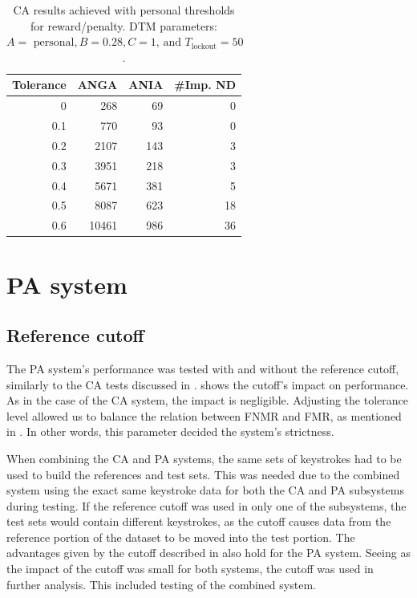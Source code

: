 \begin{table}[h]
\centering
\begin{tabular}{rrrr}
\hline
Tolerance & ANGA  & ANIA & \#Imp. ND  \\ \hline
0   & 268   & 69  & 0  \\
0.1 & 770   & 93  & 0  \\
0.2 & 2107  & 143 & 3  \\
0.3 & 3951  & 218 & 3  \\
0.4 & 5671  & 381 & 5  \\
0.5 & 8087  & 623 & 18 \\
0.6 & 10461 & 986 & 36
\end{tabular}
\caption{CA results achieved with personal thresholds for reward/penalty. DTM parameters: \\$A=\text{ personal}, B = 0.28, C=1\text{, and } T_{\text{lockout}} = 50$.}
\label{tab:CA-persRwrdThresh}
\end{table}

\section{PA system}
\label{sec:analysis-PA}
\subsection{Reference cutoff}
The PA system's performance was tested with and without the reference cutoff, similarly to the CA tests discussed in .
 shows the cutoff's impact on performance. 
As in the case of the CA system, the impact is negligible.
Adjusting the tolerance level allowed us to balance the relation between FNMR and FMR, as mentioned in .
In other words, this parameter decided the system's strictness.

When combining the CA and PA systems, the same sets of keystrokes had to be used to build the references and test sets.
This was needed due to the combined system using the exact same keystroke data for both the CA and PA subsystems during testing.
If the reference cutoff was used in only one of the subsystems, the test sets would contain different keystrokes, as the cutoff causes data from the reference portion of the dataset to be moved into the test portion.
The advantages given by the cutoff described in  also hold for the PA system.
Seeing as the impact of the cutoff was small for both systems, the cutoff was used in further analysis. This included testing of the combined system.

